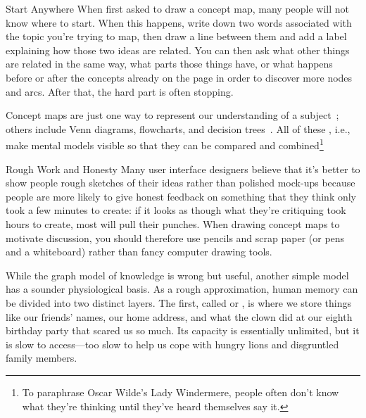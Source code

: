 \begin{aside}{Start Anywhere}
  When first asked to draw a concept map, many people will not know where to start.
  When this happens,
  write down two words associated with the topic you're trying to map,
  then draw a line between them and add a label explaining how those two ideas are related.
  You can then ask what other things are related in the same way,
  what parts those things have,
  or what happens before or after the concepts already on the page
  in order to discover more nodes and arcs.
  After that, the hard part is often stopping.
\end{aside}

Concept maps are just one way to represent our understanding of a subject~\cite{Eppl2006};
others include Venn diagrams, flowcharts, and decision trees~\cite{Abel2009}.
All of these ,
i.e.,
make mental models visible so that they can be compared and combined\footnote{To paraphrase Oscar Wilde's Lady Windermere,
people often don't know what they're thinking until they've heard themselves say it.}

\begin{aside}{Rough Work and Honesty}
  Many user interface designers believe that
  it's better to show people rough sketches of their ideas rather than polished mock-ups
  because people are more likely to give honest feedback on something that they think
  only took a few minutes to create:
  if it looks as though what they're critiquing took hours to create,
  most will pull their punches.
  When drawing concept maps to motivate discussion,
  you should therefore use pencils and scrap paper (or pens and a whiteboard)
  rather than fancy computer drawing tools.
\end{aside}


While the graph model of knowledge is wrong but useful,
another simple model has a sounder physiological basis.
As a rough approximation,
human memory can be divided into two distinct layers.
The first,
called  or ,
is where we store things like our friends' names,
our home address,
and what the clown did at our eighth birthday party that scared us so much.
Its capacity is essentially unlimited,
but it is slow to access---too slow to help us cope with hungry lions and disgruntled family members.

